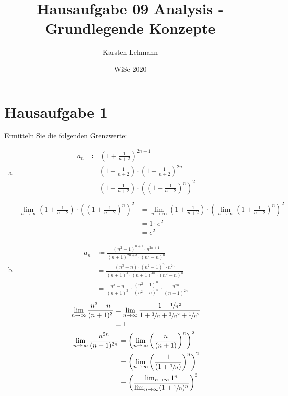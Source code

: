 \documentclass{article}
\author{Karsten Lehmann}
\date{WiSe 2020}
\title{Hausaufgabe 09 Analysis - Grundlegende Konzepte}
\begin{document}
\section*{Hausaufgabe 1}

Ermitteln Sie die folgenden Grenzwerte:

\begin{enumerate}[a)]
\item
  \begin{align*}
    a_n &\coloneqq \left( 1 + \frac{1}{n + 2} \right)^{2n + 1} \\
        &= \left( 1 + \frac{1}{n + 2} \right) \cdot \left( 1 + \frac{1}{n + 2} \right)^{2n} \\  
        &= \left( 1 + \frac{1}{n + 2} \right) \cdot \left(\left( 1 + \frac{1}{n + 2} \right)^n\right)^2 \\
  \end{align*}
  \begin{align*}
    \lim_{n\to\infty} \left( 1 + \frac{1}{n + 2} \right) \cdot \left(\left( 1 + \frac{1}{n + 2} \right)^n\right)^2
    &= \lim_{n\to\infty}\left( 1 + \frac{1}{n + 2} \right) \cdot \left(\lim_{n\to\infty}\left( 1 + \frac{1}{n + 2} \right)^n\right)^2 \\
    &= 1 \cdot e^2 \\
    &= e^2 
  \end{align*}
\item
  \begin{align*}
    a_n &\coloneqq \frac{(n^2 - 1)^{n + 1} \cdot n^{2n+1}}{(n+1)^{2n+3} \cdot (n^2 - n)^n} \\
        &= \frac{(n^3 - n) \cdot (n^2 - 1)^n \cdot n^{2n}}{(n+1)^3 \cdot (n+1)^{2n} \cdot (n^2 - n)^n} \\
        &= \frac{n^3 - n}{(n+1)^3} \cdot \frac{(n^2-1)^n}{(n^2-n)^n} \cdot \frac{n^{2n}}{(n+1)^{2n}}
  \end{align*}
  \begin{align*}
    \lim_{n\to\infty} \frac{n^3 - n}{(n+1)^3} &= \lim_{n\to\infty} \frac{1 - \sfrac{1}{n^2}}{1 + \sfrac{3}{n} + \sfrac{3}{n^2} + \sfrac{1}{n^2}} \\
    &= 1
  \end{align*}
  \begin{align*}
      \lim_{n\to\infty} \frac{n^{2n}}{(n+1)^{2n}}
      &= \left(\lim_{n\to\infty} \left(\frac{n}{(n+1)}\right)^n\right)^2 \\
      &= \left(\lim_{n\to\infty} \left(\frac{1}{(1+\sfrac{1}{n})}\right)^n\right)^2 \\
      &= \left(\frac{\lim_{n\to\infty} 1^n}{\lim_{n\to\infty} (1+\sfrac{1}{n})^n}\right)^2 \\

\end{align*}
\end{enumerate}
\end{document}
